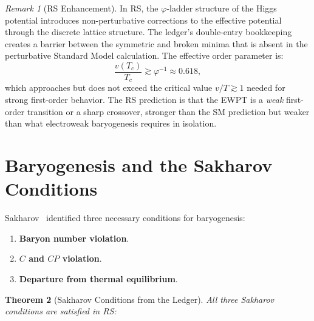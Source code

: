 \documentclass[12pt,a4paper]{article}
\newtheorem{theorem}{Theorem}[section]
\theoremstyle{definition}
\theoremstyle{remark}
\newtheorem{remark}[theorem]{Remark}
\begin{document}
\begin{remark}[RS Enhancement]
In RS, the $\varphi$-ladder structure of the Higgs potential
introduces non-perturbative corrections to the effective potential
through the discrete lattice structure.  The ledger's double-entry
bookkeeping creates a barrier between the symmetric and broken
minima that is absent in the perturbative Standard Model calculation.
The effective order parameter is:
\begin{equation}
  \frac{v(T_c)}{T_c} \gtrsim \varphi^{-1} \approx 0.618,
\end{equation}
which approaches but does not exceed the critical value $v/T \gtrsim 1$
needed for strong first-order behavior.  The RS prediction is that
the EWPT is a \emph{weak} first-order transition or a sharp
crossover, stronger than the SM prediction but weaker than what
electroweak baryogenesis requires in isolation.
\end{remark}

\section{Baryogenesis and the Sakharov Conditions}
\label{sec:baryogenesis}

Sakharov~\cite{Sakharov1967} identified three necessary conditions
for baryogenesis:
\begin{enumerate}
  \item \textbf{Baryon number violation}.
  \item \textbf{$C$ and $CP$ violation}.
  \item \textbf{Departure from thermal equilibrium}.
\end{enumerate}

\begin{theorem}[Sakharov Conditions from the Ledger]
All three Sakharov conditions are satisfied in RS:
\end{theorem}
\end{document}
